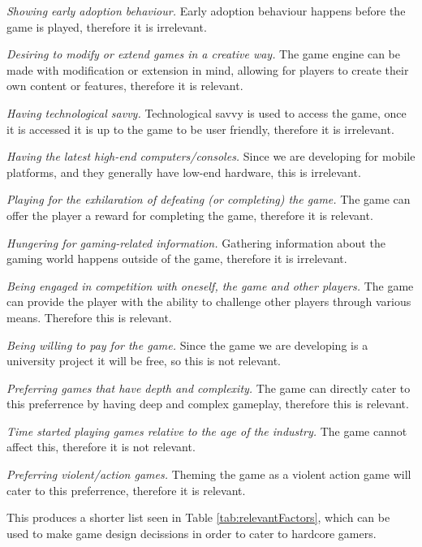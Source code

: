 \emph{Showing early adoption behaviour.}
Early adoption behaviour happens before the game is played, therefore it is irrelevant.

\emph{Desiring to modify or extend games in a creative way.}
The game engine can be made with modification or extension in mind, allowing for players to create their own content or features, therefore it is relevant.

\emph{Having technological savvy.}
Technological savvy is used to access the game, once it is accessed it is up to the game to be user friendly, therefore it is irrelevant.

\emph{Having the latest high-end computers/consoles.}
Since we are developing for mobile platforms, and they generally have low-end hardware, this is irrelevant.

\emph{Playing for the exhilaration of defeating (or completing) the game.}
The game can offer the player a reward for completing the game, therefore it is relevant.

\emph{Hungering for gaming-related information.}
Gathering information about the gaming world happens outside of the game, therefore it is irrelevant.

\emph{Being engaged in competition with oneself, the game and other players.}
The game can provide the player with the ability to challenge other players through various means. Therefore this is relevant.

\emph{Being willing to pay for the game.}
Since the game we are developing is a university project it will be free, so this is not relevant.

\emph{Preferring games that have depth and complexity.}
The game can directly cater to this preferrence by having deep and complex gameplay, therefore this is relevant.

\emph{Time started playing games relative to the age of the industry.}
The game cannot affect this, therefore it is not relevant.

\emph{Preferring violent/action games.}
Theming the game as a violent action game will cater to this preferrence, therefore it is relevant.

This produces a shorter list seen in Table \ref{tab:relevantFactors}, which can be used to make game design decissions in order to cater to hardcore gamers.

